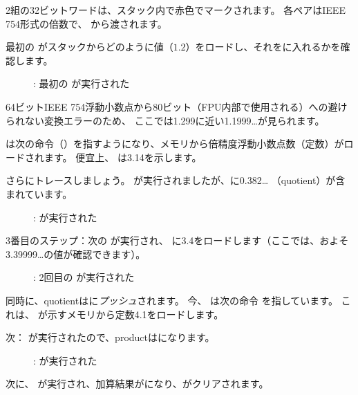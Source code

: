 ﻿\clearpage
{}
\myindex{\olly}

2組の32ビットワードは、スタック内で赤色でマークされます。
各ペアはIEEE 754形式の倍数で、 \main から渡されます。

最初の \FLD がスタックからどのように値（$1.2$）をロードし、それをに入れるかを確認します。

\begin{figure}[H]
\centering
{}
\caption{\olly: 最初の \FLD が実行された}
\label{fig:FPU_simple_olly_1}
\end{figure}

64ビットIEEE 754浮動小数点から80ビット（FPU内部で使用される）への避けられない変換エラーのため、
ここでは1.299に近い1.1999\ldots が見られます。

\EIP は次の命令（\FDIV）を指すようになり、メモリから倍精度浮動小数点数（定数）がロードされます。
便宜上、 \olly は3.14を示します。

\clearpage
さらにトレースしましょう。 
\FDIV が実行されましたが、に0.382\ldots
（\gls{quotient}）が含まれています。

\begin{figure}[H]
\centering
{}
\caption{\olly: \FDIV が実行された}
\label{fig:FPU_simple_olly_2}
\end{figure}

\clearpage
3番目のステップ：次の \FLD が実行され、
に3.4をロードします（ここでは、およそ3.39999\ldots の値が確認できます）。

\begin{figure}[H]
\centering
{}
\caption{\olly: 2回目の \FLD が実行された}
\label{fig:FPU_simple_olly_3}
\end{figure}

同時に、\gls{quotient}はに\emph{プッシュ}されます。
今、 \EIP は次の命令 \FMUL を指しています。
これは、 \olly が示すメモリから定数4.1をロードします。

\clearpage
次： \FMUL が実行されたので、\gls{product}はになります。

\begin{figure}[H]
\centering
{}
\caption{\olly: \FMUL が実行された}
\label{fig:FPU_simple_olly_4}
\end{figure}

\clearpage
次に、 \FADDP が実行され、加算結果がになり、がクリアされます。

